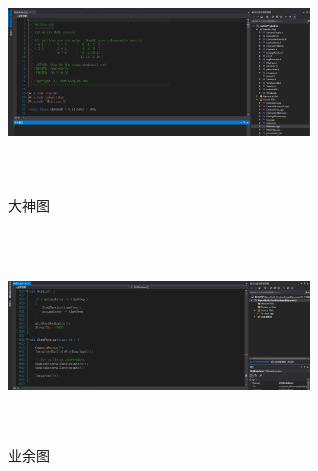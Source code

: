 \documentclass[UTF8,a4paper,8pt]{ctexbook}
\begin{document}
		 \begin{figure}
		 	\begin{center}
		 		\begin{minipage}[H]{0.5\textwidth}
		 			\centering
		 			\includegraphics[angle=0,width=8cm,height=5.6cm]{good.png}%
		 			\caption{大神图}
		 			\label{fig:Good}
		 		\end{minipage}%
		 		\begin{minipage}[H]{0.5\textwidth} 
		 			\centering
		 			\includegraphics[angle=0,width=8cm,height=5.6cm]{bad.png}
		 			\caption{业余图 }
		 			\label{fig:Bad}
		 		\end{minipage}
		 	\end{center}
		 \end{figure} 
		 
\end{document}
